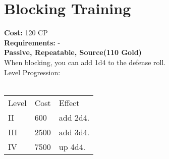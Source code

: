 \section{Blocking Training}
\textbf{Cost:} 120 CP\\
\textbf{Requirements:} -\\
\textbf{Passive, Repeatable, Source(110 Gold)}\\
When blocking, you can add 1d4 to the defense roll.
\\
Level Progression:\\
\\
\begin{tabular}{l | l | l}
	Level & Cost & Effect\\
	II & 600 & add 2d4.\\
	III & 2500 & add 3d4.\\
	IV & 7500 & up 4d4.\\
\end{tabular}